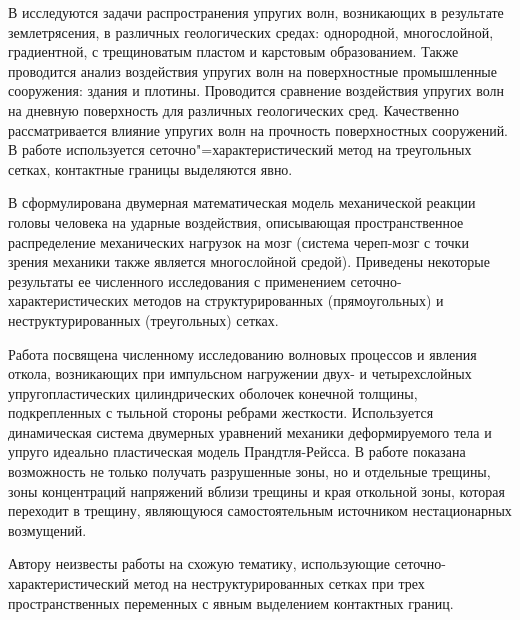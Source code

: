 В \cite{golubev_kvasov_petrov} исследуются задачи распространения упругих волн, возникающих в результате землетрясения, в различных геологических средах: однородной, многослойной, градиентной, с трещиноватым пластом и карстовым образованием. Также проводится анализ воздействия упругих волн на поверхностные промышленные сооружения: здания и плотины. Проводится сравнение воздействия упругих волн на дневную поверхность для различных геологических сред. Качественно рассматривается влияние упругих волн на прочность поверхностных сооружений. В работе используется сеточно"=характеристический метод на треугольных сетках, контактные границы выделяются явно.

В \cite{agapov_belocerkovsky_petrov} сформулирована двумерная математическая модель механической реакции головы человека на ударные воздействия, описывающая пространственное распределение механических нагрузок на мозг (система череп-мозг с точки зрения механики также является многослойной средой). Приведены некоторые результаты ее численного исследования с применением сеточно-характеристических методов на структурированных (прямоугольных) и неструктурированных (треугольных) сетках.

Работа \cite{petrov} посвящена численному исследованию волновых процессов и явления откола, возникающих при импульсном нагружении двух- и четырехслойных упругопластических цилиндрических оболочек конечной толщины, подкрепленных с тыльной стороны ребрами жесткости. Используется динамическая система двумерных уравнений механики деформируемого тела и упруго идеально пластическая модель Прандтля-Рейсса. В работе показана возможность не только получать разрушенные зоны, но и отдельные трещины, зоны концентраций напряжений вблизи трещины и края откольной зоны, которая переходит в трещину, являющуюся самостоятельным источником нестационарных возмущений.

Автору неизвесты работы на схожую тематику, использующие сеточно-характеристический метод на неструктурированных сетках при трех пространственных переменных с явным выделением контактных границ.

